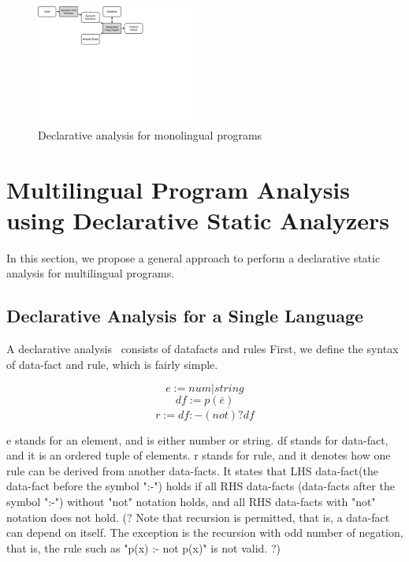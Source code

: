 \begin{figure}[t]
  \centering
  \vspace{2mm}
  \includegraphics[width=0.47\textwidth]{img/overview}
  \caption{Declarative analysis for monolingual programs}
  \label{fig:overview}
\end{figure}

\section{Multilingual Program Analysis using Declarative Static Analyzers}
\label{sec:approach}

In this section, we propose a general approach to perform a declarative
static analysis for multilingual programs.

\subsection{Declarative Analysis for a Single Language}

A declarative analysis~\cite{doop} consists of datafacts and rules
%
First, we define the syntax of data-fact and rule, which is fairly simple.

\[e := num | string\]
\[df := p(\overline{e})\]
\[r := df :- \overline{(not)? df}\]

e stands for an element, and is either number or string.  df stands for
data-fact, and it is an ordered tuple of elements.  r stands for rule, and it
denotes how one rule can be derived from another data-facts.  It states that
LHS data-fact(the data-fact before the symbol ":-") holds if all RHS data-facts
(data-facts after the symbol ":-") without "not" notation holds, and all RHS
data-facts with "not" notation does not hold.  (? Note that recursion is
permitted, that is, a data-fact can depend on itself.  The exception is the
recursion with odd number of negation, that is, the rule such as "p(x) :- not
p(x)" is not valid. ?)


